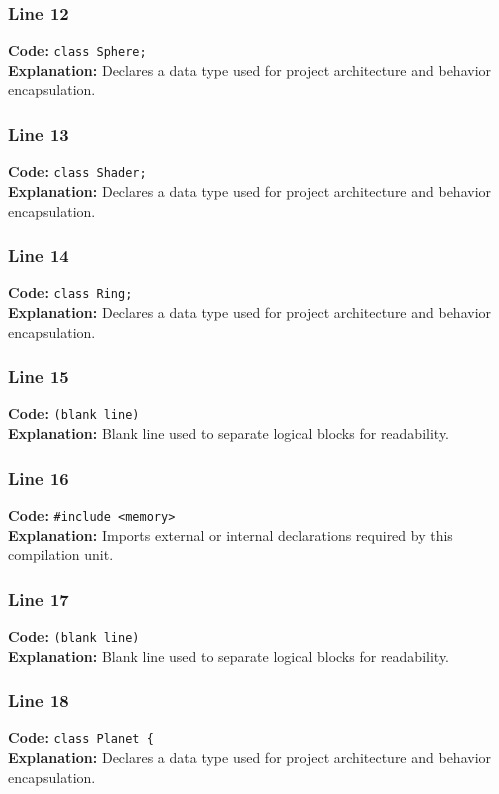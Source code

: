 \documentclass[11pt,a4paper]{article}
\begin{document}
\subsubsection*{Line 12}
\textbf{Code:} \verb|class Sphere;|\\
\textbf{Explanation:} Declares a data type used for project architecture and behavior encapsulation.

\subsubsection*{Line 13}
\textbf{Code:} \verb|class Shader;|\\
\textbf{Explanation:} Declares a data type used for project architecture and behavior encapsulation.

\subsubsection*{Line 14}
\textbf{Code:} \verb|class Ring;|\\
\textbf{Explanation:} Declares a data type used for project architecture and behavior encapsulation.

\subsubsection*{Line 15}
\textbf{Code:} \texttt{(blank line)}\\
\textbf{Explanation:} Blank line used to separate logical blocks for readability.

\subsubsection*{Line 16}
\textbf{Code:} \verb|#include <memory>|\\
\textbf{Explanation:} Imports external or internal declarations required by this compilation unit.

\subsubsection*{Line 17}
\textbf{Code:} \texttt{(blank line)}\\
\textbf{Explanation:} Blank line used to separate logical blocks for readability.

\subsubsection*{Line 18}
\textbf{Code:} \verb|class Planet {|\\
\textbf{Explanation:} Declares a data type used for project architecture and behavior encapsulation.
\end{document}

